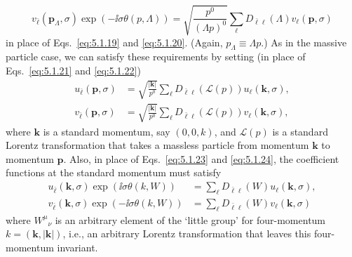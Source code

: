 \begin{equation}
v_{\bar\ell}(\mathbf p_\Lambda,\sigma)
\exp(-\ii\sigma\theta(p,\Lambda))=
\sqrt{\frac{p^0}{(\Lambda p)^0}}
\sum_\ell D_{\bar\ell\ell}(\Lambda)v_\ell(\mathbf p,\sigma)
\tag{5.9.7}\label{eq:5.9.7}
\end{equation}
in place of Eqs.~\eqref{eq:5.1.19} and \eqref{eq:5.1.20}. (Again,
$p_\Lambda\equiv\Lambda p$.) As in the massive particle case, we can satisfy
these requirements by setting (in place of Eqs.~\eqref{eq:5.1.21} and \eqref{eq:5.1.22})
\begin{align}
u_{\bar\ell}(\mathbf p,\sigma)&=
\sqrt{\frac{|\mathbf k|}{p^0}}\sum_\ell
D_{\bar\ell\ell}(\mathcal L(p))u_\ell(\mathbf k,\sigma),
\tag{5.9.8}\label{eq:5.9.8}\\
v_{\bar\ell}(\mathbf p,\sigma)&=
\sqrt{\frac{|\mathbf k|}{p^0}}\sum_\ell
D_{\bar\ell\ell}(\mathcal L(p))v_\ell(\mathbf k,\sigma),
\tag{5.9.9}\label{eq:5.9.9}
\end{align}
where $\mathbf k$ is a standard momentum, say $(0,0,k)$, and
$\mathcal L(p)$ is a standard Lorentz transformation that takes a massless
particle from momentum $\mathbf k$ to momentum $\mathbf p$. Also, in place of
Eqs.~\eqref{eq:5.1.23} and \eqref{eq:5.1.24}, the coefficient functions at the standard momentum
must satisfy
\begin{align}
u_{\bar\ell}(\mathbf k,\sigma)\exp(\ii\sigma\theta(k,W))
&=\sum_\ell D_{\bar\ell\ell}(W)u_\ell(\mathbf k,\sigma),
\tag{5.9.10}\label{eq:5.9.10}\\
v_{\bar\ell}(\mathbf k,\sigma)\exp(-\ii\sigma\theta(k,W))
&=\sum_\ell D_{\bar\ell\ell}(W)v_\ell(\mathbf k,\sigma)
\tag{5.9.11}\label{eq:5.9.11}
\end{align}
where $W^\mu{}_\nu$ is an arbitrary element of the `little group' for
four-momentum $k=(\mathbf k,|\mathbf k|)$, i.e., an arbitrary Lorentz
transformation that leaves this four-momentum invariant.


